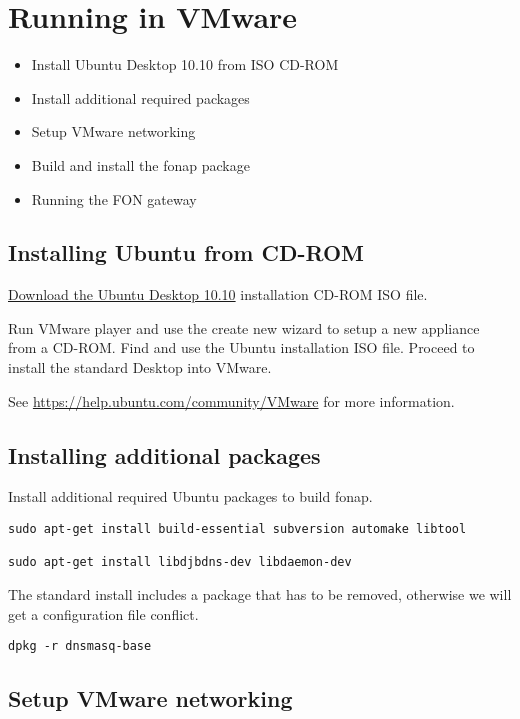 
\section{Running in VMware}

\begin{itemize}
\item Install Ubuntu Desktop 10.10 from ISO CD-ROM
\item Install additional required packages
\item Setup VMware networking
\item Build and install the fonap package
\item Running the FON gateway 
\end{itemize}

\subsection{Installing Ubuntu from CD-ROM}

\href{http://www.ubuntu.com/desktop/get-ubuntu/download}{Download the
  Ubuntu Desktop 10.10} installation CD-ROM ISO file.

Run VMware player and use the create new wizard to setup a new
appliance from a CD-ROM. Find and use the Ubuntu installation ISO
file. Proceed to install the standard Desktop into VMware. 

See \href{https://help.ubuntu.com/community/VMware}{https://help.ubuntu.com/community/VMware} for more information.

\subsection{Installing additional packages}

Install additional required Ubuntu packages to build fonap. 

\begin{verbatim}
sudo apt-get install build-essential subversion automake libtool

sudo apt-get install libdjbdns-dev libdaemon-dev
\end{verbatim}

The standard install includes a package that has to be removed,
otherwise we will get a configuration file conflict.

\begin{verbatim}
dpkg -r dnsmasq-base
\end{verbatim}

\subsection{Setup VMware networking}

